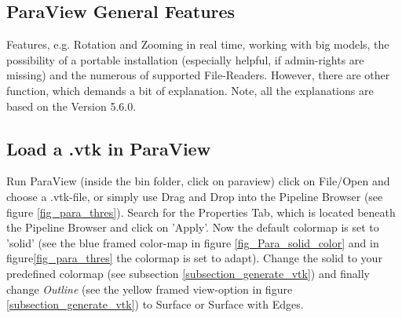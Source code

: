 \subsection{ParaView General Features }
Features, e.g.  Rotation and Zooming in real time, working with big models, the possibility of a portable installation (especially helpful, if admin-rights are missing) and the numerous of supported File-Readers. However, there are other function, which demands a bit of explanation. Note, all the explanations are based on the Version 5.6.0.

\subsection{Load a .vtk in ParaView}
Run ParaView (inside the bin folder, click on paraview) click on File/Open and choose a .vtk-file, or simply use Drag and Drop into the Pipeline Browser (see figure \ref{fig_para_thres}). Search for the Properties Tab, which is located beneath the Pipeline Browser and click on 'Apply'. Now the default  colormap is set to 'solid' (see the blue framed color-map in figure \ref{fig_Para_solid_color} and  in figure\ref{fig_para_thres} the colormap is set to adapt). Change the solid to your predefined colormap (see subsection \ref{subsection_generate_vtk}) and finally change \emph{Outline} (see the yellow framed view-option in figure \ref{subsection_generate_vtk}) to Surface or Surface with Edges.

